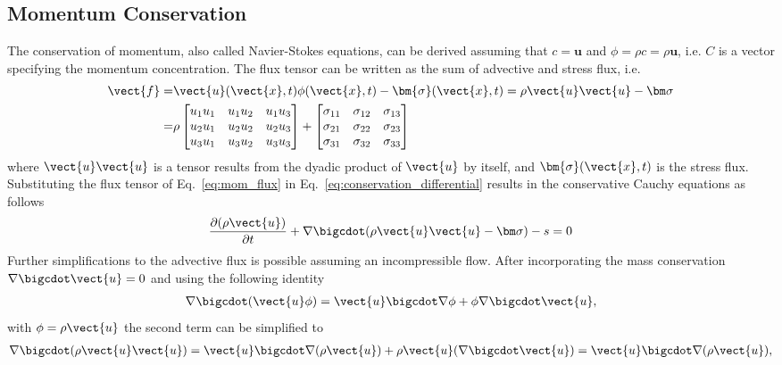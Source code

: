 \subsection{Momentum Conservation}
The conservation of momentum, also called Navier-Stokes equations, can be derived assuming that $c=\mathbf{u}$ and $\phi=\rho c=\rho \mathbf{u}$, i.e. $C$ is a vector specifying the momentum concentration. The flux tensor can be written as the sum of advective and stress flux, i.e. 
\begin{align}
\vect{f}=& \vect{u}(\vect{x},t) \phi(\vect{x},t) - \bm{\sigma}(\vect{x},t) =\rho\vect{u}\vect{u}-\bm\sigma \nonumber\\
=& \rho\begin{bmatrix}
u_1u_1& u_1u_2& u_1u_3\\
u_2u_1& u_2u_2& u_2u_3\\
u_3u_1& u_3u_2& u_3u_3\\
\end{bmatrix}+
\begin{bmatrix}
\sigma_{11}& \sigma_{12}& \sigma_{13}\\
\sigma_{21}& \sigma_{22}& \sigma_{23}\\
\sigma_{31}& \sigma_{32}& \sigma_{33}\\
\end{bmatrix}
\label{eq:mom_flux}
\end{align}
where $\vect{u} \vect{u}$ is a tensor results from the dyadic product of $\vect{u}$ by itself, and $\bm{\sigma}(\vect{x},t)$ is the stress flux. Substituting the flux tensor of Eq.~\ref{eq:mom_flux} in Eq.~\ref{eq:conservation_differential} results in the conservative Cauchy equations as follows
\begin{align}
\frac{\partial (\rho \vect{u})  }{\partial t}  + \nabla \bigcdot (\rho \vect{u} \vect{u} -  \bm \sigma) -s=0
\label{eq:Momentum_Eu}
\end{align}
 Further simplifications to the advective flux is possible assuming an incompressible flow. After incorporating the mass conservation $\nabla\bigcdot \vect{u}=0$ and using the following identity 
\begin{align}
\nabla \bigcdot (\vect{u}\phi)=  \vect{u} \bigcdot \nabla\phi + \phi \nabla \bigcdot \vect{u},\label{eq:identity}
\end{align}
with $\phi=\rho \vect{u}$ the second term can be simplified to 
\begin{align}
\nabla \bigcdot (\rho\vect{u}\vect{u})=\vect{u} \bigcdot \nabla(\rho\vect{u})+ \rho\vect{u} (\nabla \bigcdot \vect{u})=\vect{u} \bigcdot \nabla(\rho\vect{u}),
\end{align}
